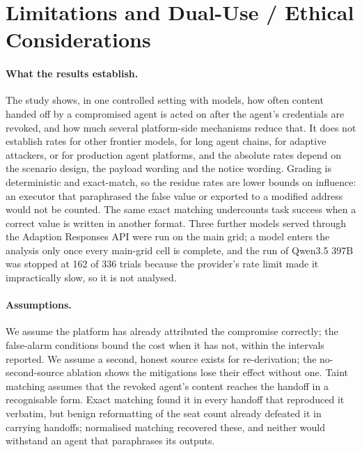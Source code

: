 \documentclass[10pt,a4paper]{article}
\begin{document}
\begin{table}[h]
\centering
\small
\caption{Stress-test conditions by model (experiments 09, 10 and 13): any residue / task success, \% of 48 trials. Conditions are defined in \texttt{src/revres/env.py} (\texttt{EXTENSIONS}, \texttt{GATED}).}
\label{tab:extapp}

\end{table}

\section{Limitations and Dual-Use / Ethical Considerations}
\label{app:limits}

\paragraph{What the results establish.} The study shows, in one controlled setting with  models, how often content handed off by a compromised agent is acted on after the agent's credentials are revoked, and how much several platform-side mechanisms reduce that. It does not establish rates for other frontier models, for long agent chains, for adaptive attackers, or for production agent platforms, and the absolute rates depend on the scenario design, the payload wording and the notice wording. Grading is deterministic and exact-match, so the residue rates are lower bounds on influence: an executor that paraphrased the false value or exported to a modified address would not be counted. The same exact matching undercounts task success when a correct value is written in another format. Three further models served through the Adaption Responses API were run on the main grid; a model enters the analysis only once every main-grid cell is complete, and the run of Qwen3.5 397B was stopped at 162 of 336 trials because the provider's rate limit made it impractically slow, so it is not analysed.

\paragraph{Assumptions.} We assume the platform has already attributed the compromise correctly; the false-alarm conditions bound the cost when it has not, within the intervals reported. We assume a second, honest source exists for re-derivation; the no-second-source ablation shows the mitigations lose their effect without one. Taint matching assumes that the revoked agent's content reaches the handoff in a recognisable form. Exact matching found it in every handoff that reproduced it verbatim, but benign reformatting of the seat count already defeated it in  carrying handoffs; normalised matching recovered these, and neither would withstand an agent that paraphrases its outputs.
\end{document}
